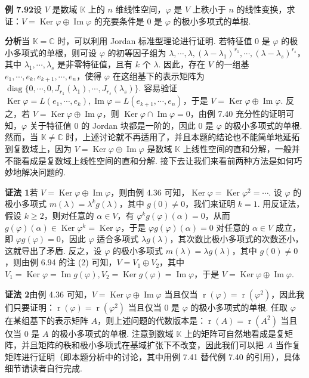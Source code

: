 \documentclass[UTF8,12pt,a4paper,fontset=fandol]{ctexart}
\begin{document}
\noindent\textbf{例 7.92}\quad 设 $V$ 是数域 $\mathbb{K}$ 上的 $n$ 维线性空间，$\varphi$ 是 $V$ 上秩小于 $n$ 的线性变换，求证：$V=\operatorname{Ker}\varphi\oplus\operatorname{Im}\varphi$ 的充要条件是 0 是 $\varphi$ 的极小多项式的单根.

\noindent\textbf{分析}\quad 当 $\mathbb{K}=\mathbb{C}$ 时，可以利用 Jordan 标准型理论进行证明. 若特征值 0 是 $\varphi$ 的极小多项式的单根，则可设 $\varphi$ 的初等因子组为 $\lambda,\cdots,\lambda,(\lambda-\lambda_1)^{r_1},\cdots,(\lambda-\lambda_s)^{r_s}$，其中 $\lambda_1,\cdots,\lambda_s$ 是非零特征值，且有 $k$ 个 $\lambda$. 因此，存在 $V$ 的一组基 $e_1,\cdots,e_k,e_{k+1},\cdots,e_n$，使得 $\varphi$ 在这组基下的表示矩阵为 $\operatorname{diag}\{0,\cdots,0,J_{r_1}(\lambda_1),\cdots,J_{r_s}(\lambda_s)\}$. 容易验证 $\operatorname{Ker}\varphi=L(e_1,\cdots,e_k),\operatorname{Im}\varphi=L(e_{k+1},\cdots,e_n)$，于是 $V=\operatorname{Ker}\varphi\oplus\operatorname{Im}\varphi$. 反之，若 $V=\operatorname{Ker}\varphi\oplus\operatorname{Im}\varphi$，则 $\operatorname{Ker}\varphi\cap\operatorname{Im}\varphi=0$，由例 7.40 充分性的证明可知，$\varphi$ 关于特征值 0 的 Jordan 块都是一阶的，因此 0 是 $\varphi$ 的极小多项式的单根. 然而，当 $\mathbb{K}\ne\mathbb{C}$ 时，上述讨论就不再适用了，并且本题的结论也不能简单地延拓到复数域上，因为 $V=\operatorname{Ker}\varphi\oplus\operatorname{Im}\varphi$ 是数域 $\mathbb{K}$ 上线性空间的直和分解，一般并不能看成是复数域上线性空间的直和分解. 接下去让我们来看前两种方法是如何巧妙地解决问题的.

\noindent\textbf{证法 1}\quad 若 $V=\operatorname{Ker}\varphi\oplus\operatorname{Im}\varphi$，则由例 4.36 可知，$\operatorname{Ker}\varphi=\operatorname{Ker}\varphi^2=\cdots$. 设 $\varphi$ 的极小多项式 $m(\lambda)=\lambda^kg(\lambda)$，其中 $g(0)\ne0$，我们来证明 $k=1$. 用反证法，假设 $k\ge2$，则对任意的 $\alpha\in V$，有 $\varphi^kg(\varphi)(\alpha)=0$，从而 $g(\varphi)(\alpha)\in\operatorname{Ker}\varphi^k=\operatorname{Ker}\varphi$，于是 $\varphi g(\varphi)(\alpha)=0$ 对任意的 $\alpha\in V$ 成立，即 $\varphi g(\varphi)=0$，因此 $\varphi$ 适合多项式 $\lambda g(\lambda)$，其次数比极小多项式的次数还小，这就导出了矛盾. 反之，设 $\varphi$ 的极小多项式 $m(\lambda)=\lambda g(\lambda)$，其中 $g(0)\ne0$，则由例 6.94 的注 (2) 可知，$V=V_1\oplus V_2$，其中 $V_1=\operatorname{Ker}\varphi=\operatorname{Im}g(\varphi),V_2=\operatorname{Ker}g(\varphi)=\operatorname{Im}\varphi$，于是 $V=\operatorname{Ker}\varphi\oplus\operatorname{Im}\varphi$.

\noindent\textbf{证法 2}\quad 由例 4.36 可知，$V=\operatorname{Ker}\varphi\oplus\operatorname{Im}\varphi$ 当且仅当 $\operatorname{r}(\varphi)=\operatorname{r}(\varphi^2)$，因此我们只要证明：$\operatorname{r}(\varphi)=\operatorname{r}(\varphi^2)$ 当且仅当 0 是 $\varphi$ 的极小多项式的单根. 任取 $\varphi$ 在某组基下的表示矩阵 $A$，则上述问题的代数版本是：$\operatorname{r}(A)=\operatorname{r}(A^2)$ 当且仅当 0 是 $A$ 的极小多项式的单根. 注意到数域 $\mathbb{K}$ 上的矩阵可自然地看成是复矩阵，并且矩阵的秩和极小多项式在基域扩张下不改变，因此我们可以把 $A$ 当作复矩阵进行证明（即本题分析中的讨论，其中用例 7.41 替代例 7.40 的引用），具体细节请读者自行完成.
\end{document}
